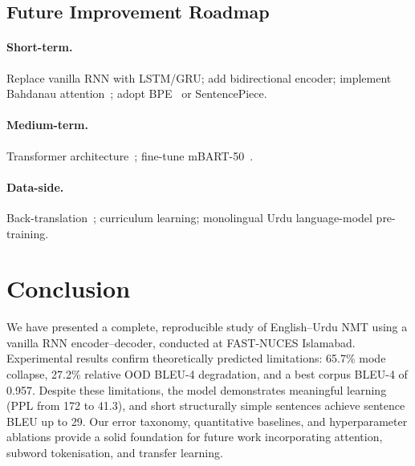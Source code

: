 \documentclass[runningheads]{llncs}
\begin{document}
\subsection{Future Improvement Roadmap}

\paragraph{Short-term.}
Replace vanilla RNN with LSTM/GRU; add bidirectional encoder; implement
Bahdanau attention~\cite{bahdanau2015}; adopt BPE~\cite{sennrich2016} or
SentencePiece.

\paragraph{Medium-term.}
Transformer architecture~\cite{vaswani2017}; fine-tune mBART-50~\cite{liu2020}.

\paragraph{Data-side.}
Back-translation~\cite{sennrich2016bt}; curriculum learning; monolingual Urdu
language-model pre-training.

\section{Conclusion}
\label{sec:conclusion}

We have presented a complete, reproducible study of English--Urdu NMT using a
vanilla RNN encoder--decoder, conducted at FAST-NUCES Islamabad. Experimental
results confirm theoretically predicted limitations: 65.7\% mode collapse,
27.2\% relative OOD BLEU-4 degradation, and a best corpus BLEU-4 of 0.957.
Despite these limitations, the model demonstrates meaningful learning (PPL from
172 to 41.3), and short structurally simple sentences achieve sentence BLEU up
to 29. Our error taxonomy, quantitative baselines, and hyperparameter ablations
provide a solid foundation for future work incorporating attention, subword
tokenisation, and transfer learning.
\end{document}
